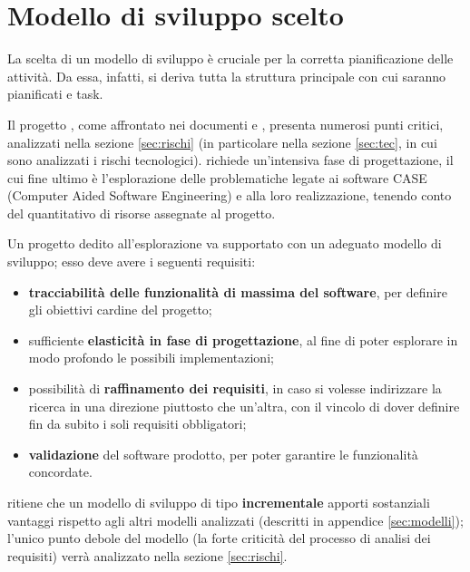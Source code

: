 
\section{Modello di sviluppo scelto} \label{sec:modscelto}

La scelta di un modello di sviluppo è cruciale per la corretta pianificazione delle attività. Da essa, infatti, si deriva tutta la struttura principale con cui saranno pianificati  e task.

Il progetto \proj, come affrontato nei documenti \SdF{} e \PdQ, presenta numerosi punti critici, analizzati nella sezione \ref{sec:rischi} (in particolare nella sezione \ref{sec:tec}, in cui sono analizzati i rischi tecnologici). \proj{} richiede un'intensiva fase di progettazione, il cui fine ultimo è l'esplorazione delle problematiche legate ai software CASE (Computer Aided Software Engineering) e alla loro realizzazione, tenendo conto del quantitativo di risorse assegnate al progetto. %

Un progetto dedito all'esplorazione va supportato con un adeguato modello di sviluppo; esso deve avere i seguenti requisiti:
\begin{itemize}
	\item \textbf{tracciabilità delle funzionalità di massima del software}, per definire gli obiettivi cardine del progetto;
	\item sufficiente \textbf{elasticità in fase di progettazione}, al fine di poter esplorare in modo profondo le possibili implementazioni;
	\item possibilità di \textbf{raffinamento dei requisiti}, in caso si volesse indirizzare la ricerca in una direzione piuttosto che un'altra, con il vincolo di dover definire fin da subito i soli requisiti obbligatori;
	\item \textbf{validazione} del software prodotto, per poter garantire le funzionalità concordate.
\end{itemize}

\hx{} ritiene che un modello di sviluppo di tipo \textbf{incrementale} apporti sostanziali vantaggi rispetto agli altri modelli analizzati (descritti in appendice \ref{sec:modelli}); l'unico punto debole del modello (la forte criticità del processo di analisi dei requisiti) verrà analizzato nella sezione \ref{sec:rischi}.

